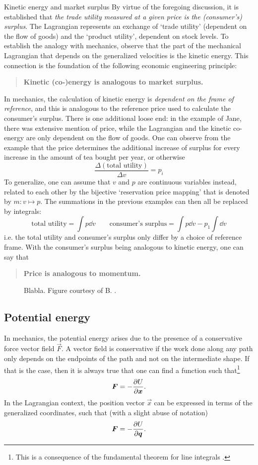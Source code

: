 \begin{econ}{Kinetic energy and market surplus}
   By virtue of the foregoing discussion, it is established that \emph{the trade utility measured at a given price is the (consumer's) surplus}. The Lagrangian represents an exchange of `trade utility' (dependent on the flow of goods) and the `product utility', dependent on stock levels. To establish the analogy with mechanics, observe that the part of the mechanical Lagrangian that depends on the generalized velocities is the kinetic energy. This connection is the foundation of the following economic engineering principle:
    \begin{quote}
        \textbf{Kinetic (co-)energy is analogous to market surplus.}
    \end{quote}
    In mechanics, the calculation of kinetic energy is \emph{dependent on the frame of reference}, and this is analogous to the reference price used to calculate the consumer's surplus. There is one additional loose end: in the example of Jane, there was extensive mention of price, while the Lagrangian and the kinetic co-energy are only dependent on the flow of goods. One can observe from the example that the price determines the additional increase of surplus for every increase in the amount of tea bought per year, or otherwise
    $$
        \frac{\Delta (\text{total utility})}{\Delta v} = p_i
    $$
    To generalize, one can assume that $v$ and $p$ are continuous variables instead, related to each other by the bijective `reservation price mapping' that is denoted by $m: v \mapsto p$. The summations in the previous examples can then all be replaced by integrals:
    $$ 
        \text{total utility} = \int p\dd{v} \qquad 
        \text{consumer's surplus} = \int p\dd{v} - p_1\int \dd{v}
    $$ 
    i.e. the total utility and consumer's surplus only differ by a choice of reference frame. With the consumer's surplus being analogous to kinetic energy, one can say that
    \begin{quote}
        \textbf{Price is analogous to momentum.}
    \end{quote}
\end{econ}

\begin{figure}[ht]
    \centering
    
    \caption{Blabla. Figure courtesy of B. \citet{Krabbenborg2021}.}
    \label{fig:kinetic_energy}
\end{figure}

\subsection{Potential energy}
In mechanics, the potential energy arises due to the presence of a conservative force vector field $\vec{F}$. A vector field is conservative if the work done along any path only depends on the endpoints of the path and not on the intermediate shape. If that is the case, then it is always true that one can find a function such that\footnote{This is a consequence of the fundamental theorem for line integrals \cite{Stewart2012}.}
$$ \vb*{F} = - \pdv{U}{\vb*{x}}. $$
In the Lagrangian context, the position vector $\vec{x}$ can be expressed in terms of the generalized coordinates, such that (with a slight abuse of notation)
$$ \vb*{F} = -\pdv{U}{\ensuremath{\vb*{q}}}. $$

